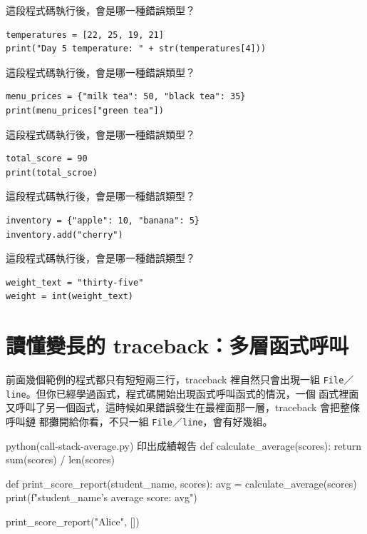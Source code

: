 \begin{drills}[label=drills:error-types]
\item 這段程式碼執行後，會是哪一種錯誤類型？
\begin{verbatim}
temperatures = [22, 25, 19, 21]
print("Day 5 temperature: " + str(temperatures[4]))
\end{verbatim}
\item 這段程式碼執行後，會是哪一種錯誤類型？
\begin{verbatim}
menu_prices = {"milk tea": 50, "black tea": 35}
print(menu_prices["green tea"])
\end{verbatim}
\item 這段程式碼執行後，會是哪一種錯誤類型？
\begin{verbatim}
total_score = 90
print(total_scroe)
\end{verbatim}
\item 這段程式碼執行後，會是哪一種錯誤類型？
\begin{verbatim}
inventory = {"apple": 10, "banana": 5}
inventory.add("cherry")
\end{verbatim}
\item 這段程式碼執行後，會是哪一種錯誤類型？
\begin{verbatim}
weight_text = "thirty-five"
weight = int(weight_text)
\end{verbatim}
\end{drills}

\section{讀懂變長的 traceback：多層函式呼叫}
\label{sec:call-stack}

前面幾個範例的程式都只有短短兩三行，traceback 裡自然只會出現一組
\texttt{File}／\texttt{line}。但你已經學過函式，程式碼開始出現函式呼叫函式的情況，一個
函式裡面又呼叫了另一個函式，這時候如果錯誤發生在最裡面那一層，traceback 會把整條呼叫鏈
都攤開給你看，不只一組 \texttt{File}／\texttt{line}，會有好幾組。

\begin{example}{python}{(call-stack-average.py) 印出成績報告}
def calculate_average(scores):
    return sum(scores) / len(scores)

def print_score_report(student_name, scores):
    avg = calculate_average(scores)
    print(f"{student_name}'s average score: {avg}")

print_score_report("Alice", [])
\end{example}

